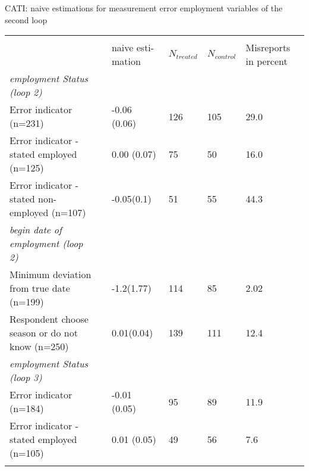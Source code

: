 \begin{threeparttable}[h]
	\centering
	\singlespacing
	\caption{CATI: naive estimations for measurement error employment variables of the second loop}
	\label{tab:emp_loop2_3}
	\begin{tabularx}{\textwidth}{@{}Xp{0.1cm}p{1.5cm}p{1cm}p{1cm}p{1.5cm}}
		&               &     &       &     &        \\
		&  & naive \newline esti-mation & \(N_{treated}\) & \(N_{control}\) & Misreports \newline in \newline percent \\
		
		\textit{employment Status (loop 2)}                                   	 							&               &   &  &            &                 \\ \midrule\addlinespace 
		Error indicator (n=231) &	 &-0.06 \newline (0.06)    &126            &105 & 29.0               \\ \addlinespace \addlinespace
		Error indicator - stated employed (n=125) &        &0.00 \newline (0.07)    &75 &50&16.0                 \\  \addlinespace\addlinespace
		Error indicator - stated non-employed (n=107)& & -0.05\newline(0.1)&51&55&44.3 \\ \addlinespace \addlinespace
		\textit{begin date of employment (loop 2)}                               								&&&& & \\ \midrule\addlinespace
		Minimum deviation from true date (n=199) &            &-1.2\newline (1.77)&114&85&2.02\tnote{a} \\ \addlinespace \addlinespace
		Respondent choose season or do not know (n=250)  &     &0.01\newline (0.04)&139&111&12.4 \\ \addlinespace \addlinespace
		\textit{employment Status (loop 3)}                                   	 							&               &   &  &            &                 \\ \midrule\addlinespace 
		Error indicator (n=184) &	 &-0.01 \newline (0.05)    & 95           &89 & 11.9               \\ \addlinespace \addlinespace
		Error indicator - stated employed (n=105) &        &0.01 \newline (0.05)    &49 &56&7.6                 \\  \addlinespace\addlinespace

\end{tabularx}
\end{threeparttable}
